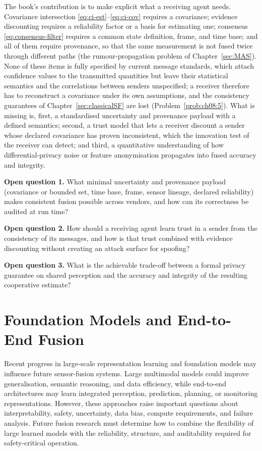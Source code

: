 The book's contribution is to make explicit what a receiving agent needs. Covariance intersection \eqref{eq:ci-est}--\eqref{eq:ci-cov} requires a covariance; evidence discounting requires a reliability factor or a basis for estimating one; consensus \eqref{eq:consensus-filter} requires a common state definition, frame, and time base; and all of them require provenance, so that the same measurement is not fused twice through different paths (the rumour-propagation problem of Chapter~\ref{sec:MAS}). None of these items is fully specified by current message standards, which attach confidence values to the transmitted quantities but leave their statistical semantics and the correlations between senders unspecified; a receiver therefore has to reconstruct a covariance under its own assumptions, and the consistency guarantees of Chapter~\ref{sec:classicalSF} are lost (Problem~\ref{prob:ch08:5}). What is missing is, first, a standardised uncertainty and provenance payload with a defined semantics; second, a trust model that lets a receiver discount a sender whose declared covariance has proven inconsistent, which the innovation test of the receiver can detect; and third, a quantitative understanding of how differential-privacy noise or feature anonymisation propagates into fused accuracy and integrity.

\begin{list4a}
    \item \textbf{Open question 1.} What minimal uncertainty and provenance payload (covariance or bounded set, time base, frame, sensor lineage, declared reliability) makes consistent fusion possible across vendors, and how can its correctness be audited at run time?
    \item \textbf{Open question 2.} How should a receiving agent learn trust in a sender from the consistency of its messages, and how is that trust combined with evidence discounting without creating an attack surface for spoofing?
    \item \textbf{Open question 3.} What is the achievable trade-off between a formal privacy guarantee on shared perception and the accuracy and integrity of the resulting cooperative estimate?
\end{list4a}

\section{Foundation Models and End-to-End Fusion}
\label{subsec:oc-foundation}
%
Recent progress in large-scale representation learning and foundation models may influence future sensor-fusion systems. Large multimodal models could improve generalisation, semantic reasoning, and data efficiency, while end-to-end architectures may learn integrated perception, prediction, planning, or monitoring representations. However, these approaches raise important questions about interpretability, safety, uncertainty, data bias, compute requirements, and failure analysis. Future fusion research must determine how to combine the flexibility of large learned models with the reliability, structure, and auditability required for safety-critical operation.

